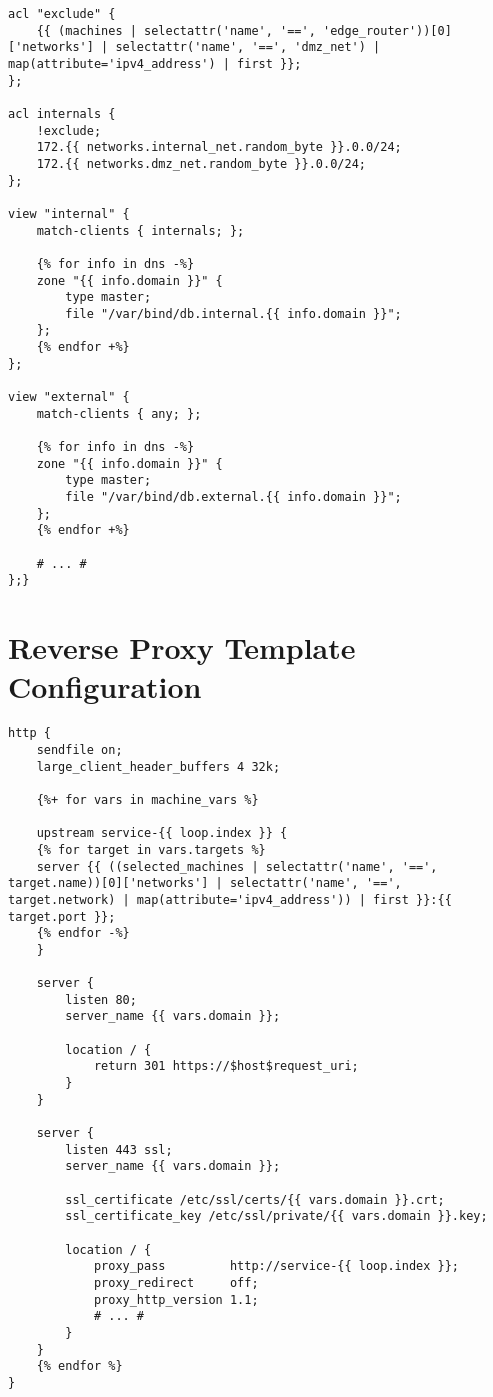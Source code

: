 \begin{lstlisting}[caption=DNS Server Template Configuration.]
acl "exclude" {
    {{ (machines | selectattr('name', '==', 'edge_router'))[0]['networks'] | selectattr('name', '==', 'dmz_net') | map(attribute='ipv4_address') | first }};
};

acl internals {
    !exclude;
    172.{{ networks.internal_net.random_byte }}.0.0/24;
    172.{{ networks.dmz_net.random_byte }}.0.0/24;
};

view "internal" {
    match-clients { internals; };

    {% for info in dns -%}
    zone "{{ info.domain }}" {
        type master;
        file "/var/bind/db.internal.{{ info.domain }}";
    };
    {% endfor +%}
};

view "external" {
    match-clients { any; };

    {% for info in dns -%}
    zone "{{ info.domain }}" {
        type master;
        file "/var/bind/db.external.{{ info.domain }}";
    };
    {% endfor +%}

    # ... #
};}
\end{lstlisting}

\chapter{Reverse Proxy Template Configuration} \label{ap1:ansible_vars_reverse_proxy_template_conf}

\begin{lstlisting}[caption=Reverse Proxy Template Configuration.]
http {
    sendfile on;
    large_client_header_buffers 4 32k;

    {%+ for vars in machine_vars %}
    
    upstream service-{{ loop.index }} {
    {% for target in vars.targets %}
    server {{ ((selected_machines | selectattr('name', '==', target.name))[0]['networks'] | selectattr('name', '==', target.network) | map(attribute='ipv4_address')) | first }}:{{ target.port }};
    {% endfor -%}
    }

    server {
        listen 80;
        server_name {{ vars.domain }};

        location / {
            return 301 https://$host$request_uri;
        }
    }

    server {
        listen 443 ssl;
        server_name {{ vars.domain }};

        ssl_certificate /etc/ssl/certs/{{ vars.domain }}.crt;
        ssl_certificate_key /etc/ssl/private/{{ vars.domain }}.key;

        location / {
            proxy_pass         http://service-{{ loop.index }};
            proxy_redirect     off;
            proxy_http_version 1.1;
            # ... #
        }
    }
    {% endfor %}
}
\end{lstlisting}

